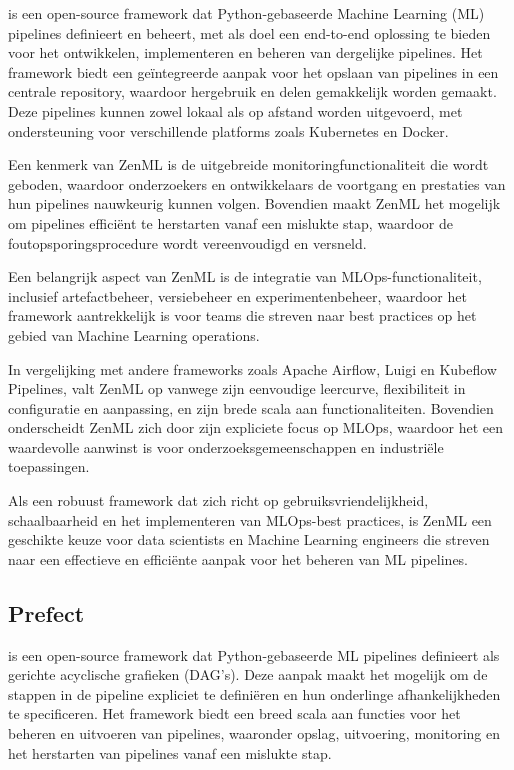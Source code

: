 \autocite{ZenML2024} is een open-source framework dat Python-gebaseerde Machine Learning (ML) pipelines definieert en beheert, met als doel een end-to-end oplossing te bieden voor het ontwikkelen, implementeren en beheren van dergelijke pipelines. Het framework biedt een geïntegreerde aanpak voor het opslaan van pipelines in een centrale repository, waardoor hergebruik en delen gemakkelijk worden gemaakt. Deze pipelines kunnen zowel lokaal als op afstand worden uitgevoerd, met ondersteuning voor verschillende platforms zoals Kubernetes en Docker.

Een kenmerk van ZenML is de uitgebreide monitoringfunctionaliteit die wordt geboden, waardoor onderzoekers en ontwikkelaars de voortgang en prestaties van hun pipelines nauwkeurig kunnen volgen. Bovendien maakt ZenML het mogelijk om pipelines efficiënt te herstarten vanaf een mislukte stap, waardoor de foutopsporingsprocedure wordt vereenvoudigd en versneld.

Een belangrijk aspect van ZenML is de integratie van MLOps-functionaliteit, inclusief artefactbeheer, versiebeheer en experimentenbeheer, waardoor het framework aantrekkelijk is voor teams die streven naar best practices op het gebied van Machine Learning operations.

In vergelijking met andere frameworks zoals Apache Airflow, Luigi en Kubeflow Pipelines, valt ZenML op vanwege zijn eenvoudige leercurve, flexibiliteit in configuratie en aanpassing, en zijn brede scala aan functionaliteiten. Bovendien onderscheidt ZenML zich door zijn expliciete focus op MLOps, waardoor het een waardevolle aanwinst is voor onderzoeksgemeenschappen en industriële toepassingen.

Als een robuust framework dat zich richt op gebruiksvriendelijkheid, schaalbaarheid en het implementeren van MLOps-best practices, is ZenML een geschikte keuze voor data scientists en Machine Learning engineers die streven naar een effectieve en efficiënte aanpak voor het beheren van ML pipelines.


\subsection{Prefect}

\autocite{Prefect2024} is een open-source framework dat Python-gebaseerde ML pipelines definieert als gerichte acyclische grafieken (DAG's). Deze aanpak maakt het mogelijk om de stappen in de pipeline expliciet te definiëren en hun onderlinge afhankelijkheden te specificeren. Het framework biedt een breed scala aan functies voor het beheren en uitvoeren van pipelines, waaronder opslag, uitvoering, monitoring en het herstarten van pipelines vanaf een mislukte stap.

